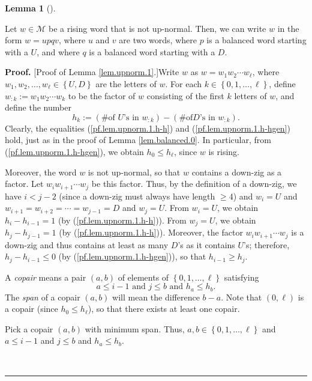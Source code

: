 \documentclass[numbers=enddot,12pt,final,onecolumn,notitlepage]{scrartcl}%
\theoremstyle{definition}
\newtheorem{lem}[theo]{Lemma}
\newenvironment{lemma}[1][]
{\begin{lem}[#1]\begin{leftbar}}
{\end{leftbar}\end{lem}}
\newenvironment{proof}[1][Proof]{\noindent\textbf{#1.} }{\ \rule{0.5em}{0.5em}}
\newcommand{\M}{\mathcal{M}}
\newenvironment{verlong}{}{}
\begin{document}
\begin{verlong}
\begin{lemma}
\label{lem.upnorm.1}Let $w\in\M$ be a rising word that is not
up-normal. Then, we can write $w$ in the form $w=upqv$, where $u$ and $v$ are
two words, where $p$ is a balanced word starting with a $U$, and where $q$ is
a balanced word starting with a $D$.
\end{lemma}

\begin{proof}
[Proof of Lemma \ref{lem.upnorm.1}.]Write $w$ as $w=w_{1}w_{2}\cdots w_{\ell}%
$, where $w_{1},w_{2},\ldots,w_{\ell}\in\left\{  U,D\right\}  $ are the
letters of $w$. For each $k\in\left\{  0,1,\ldots,\ell\right\}  $, define
$w_{:k}:=w_{1}w_{2}\cdots w_{k}$ to be the factor of $w$ consisting of the
first $k$ letters of $w$, and define the number%
\[
h_{k}:=\left(  \text{\# of }U\text{'s in }w_{:k}\right)  -\left(  \text{\# of
}D\text{'s in }w_{:k}\right)  .
\]
Clearly, the equalities (\ref{pf.lem.upnorm.1.h-h}) and
(\ref{pf.lem.upnorm.1.h-hgen}) hold, just as in the proof of Lemma
\ref{lem.balanced.0}. In particular, from (\ref{pf.lem.upnorm.1.h-hgen}), we
obtain $h_{0}\leq h_{\ell}$, since $w$ is rising.

Moreover, the word $w$ is not up-normal, so that $w$ contains a down-zig as a
factor. Let $w_{i}w_{i+1}\cdots w_{j}$ be this factor.
Thus, by the definition of a down-zig, we have $i<j-2$ (since a
down-zig must always have length $\geq4$) and $w_{i}=U$ and $w_{i+1}%
=w_{i+2}=\cdots=w_{j-1}=D$ and $w_{j}=U$.
From $w_{i}=U$, we obtain
$h_{i}-h_{i-1}=1$ (by (\ref{pf.lem.upnorm.1.h-h})). From $w_{j}=U$, we obtain
$h_{j}-h_{j-1}=1$ (by (\ref{pf.lem.upnorm.1.h-h})). Moreover, the factor
$w_{i}w_{i+1}\cdots w_{j}$ is a down-zig and thus contains at least as many
$D$'s as it contains $U$'s; therefore, $h_{j}-h_{i-1}\leq0$ (by
(\ref{pf.lem.upnorm.1.h-hgen})), so that $h_{i-1}\geq h_{j}$.

A \emph{copair} means a pair $\left(  a,b\right)  $ of elements of
$\left\{  0,1,\ldots,\ell\right\}  $ satisfying%
\[
a\leq i-1\text{ and }j\leq b\text{ and }h_{a}\leq h_{b}.
\]
The \emph{span} of a copair $\left(  a,b\right)  $ will mean the difference
$b-a$. Note that $\left(  0,\ell\right)  $ is a copair (since $h_{0}\leq
h_{\ell}$), so that there exists at least one copair.

Pick a copair $\left(  a,b\right)  $ with minimum span. Thus, $a,b\in\left\{
0,1,\ldots,\ell\right\}  $ and $a\leq i-1$ and $j\leq b$ and $h_{a}\leq h_{b}$.


\end{proof}
\end{verlong}
\end{document}
